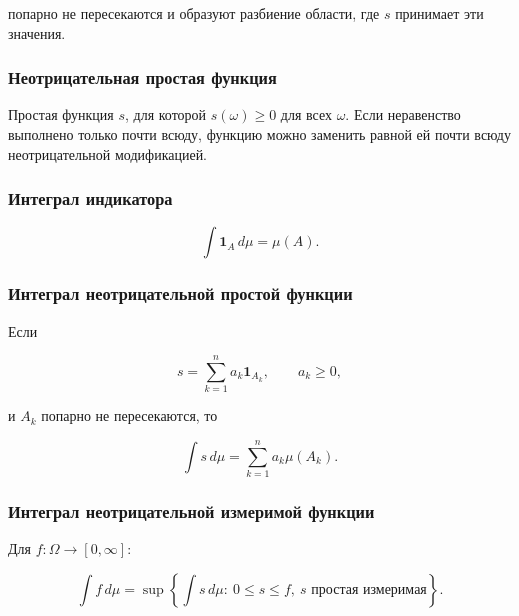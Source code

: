 \documentclass[
  11pt,
  a4paper,
]{article}
\begin{document}
попарно не пересекаются и образуют разбиение области, где \(s\)
принимает эти значения.

\subsubsection{Неотрицательная простая
функция}\label{ux43dux435ux43eux442ux440ux438ux446ux430ux442ux435ux43bux44cux43dux430ux44f-ux43fux440ux43eux441ux442ux430ux44f-ux444ux443ux43dux43aux446ux438ux44f}

Простая функция \(s\), для которой \(s(\omega)\ge0\) для всех
\(\omega\). Если неравенство выполнено только почти всюду, функцию можно
заменить равной ей почти всюду неотрицательной модификацией.

\subsubsection{Интеграл
индикатора}\label{ux438ux43dux442ux435ux433ux440ux430ux43b-ux438ux43dux434ux438ux43aux430ux442ux43eux440ux430}

\[
\int \mathbf 1_A\,d\mu=\mu(A).
\]

\subsubsection{Интеграл неотрицательной простой
функции}\label{ux438ux43dux442ux435ux433ux440ux430ux43b-ux43dux435ux43eux442ux440ux438ux446ux430ux442ux435ux43bux44cux43dux43eux439-ux43fux440ux43eux441ux442ux43eux439-ux444ux443ux43dux43aux446ux438ux438}

Если

\[
s=\sum_{k=1}^n a_k\mathbf 1_{A_k},
\qquad
a_k\ge0,
\]

и \(A_k\) попарно не пересекаются, то

\[
\int s\,d\mu=\sum_{k=1}^n a_k\mu(A_k).
\]

\subsubsection{Интеграл неотрицательной измеримой
функции}\label{ux438ux43dux442ux435ux433ux440ux430ux43b-ux43dux435ux43eux442ux440ux438ux446ux430ux442ux435ux43bux44cux43dux43eux439-ux438ux437ux43cux435ux440ux438ux43cux43eux439-ux444ux443ux43dux43aux446ux438ux438}

Для \(f:\Omega\to[0,\infty]\):

\[
\int f\,d\mu
=
\sup\left\{\int s\,d\mu:\ 0\le s\le f,\ s\text{ простая измеримая}\right\}.
\]
\end{document}
